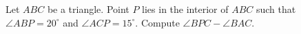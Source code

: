Let $ABC$ be a triangle. Point $P$ lies in the interior of $ABC$ such that $\angle ABP=20^\circ$ and $\angle ACP=15^\circ$. Compute $\angle BPC-\angle BAC$.
